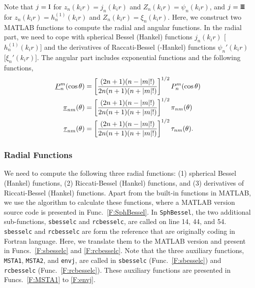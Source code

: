 \documentclass[journal=jacsat,manuscript=article,layout=traditional]{achemso}
\newcommand{\norF}[1]{\underline{\vb{#1}}}
\newcommand{\joinR}{\hspace{-.17em}}
\newcommand{\NRomanI}{\normalsize\textrm{I}}
\newcommand{\NRomanIII}{\mbox{\NRomanI\joinR\NRomanI\joinR\NRomanI}}
\newcommand{\subsubsectiontoc}[1]{\subsubsection{#1}\addcontentsline{toc}{subsubsection}{#1}}
\newcommand{\cfont}[1]{\texttt{#1}}
\begin{document}
Note that $j=\NRomanI$ for $z_n(k_ir)=j_n(k_ir)$ and $Z_n(k_ir)=\psi_n(k_ir)$, and $j=\NRomanIII$ for $z_n(k_ir)=h_n^{(1)}(k_ir)$ and $Z_n(k_ir)=\xi_n(k_ir)$.
Here, we construct two MATLAB functions to compute the radial and angular functions.
In the radial part, we need to cope with spherical Bessel (Hankel) functions $j_n(k_ir)$ [$h_n^{(1)}(k_ir)$] and the derivatives of Raccati-Bessel (-Hankel) functions $\psi_{n}'(k_ir)$ [$\xi_{n}'(k_ir)$].
The angular part includes exponential functions and the following functions, 
\begin{subequations}
    \begin{align}
        \underline{P}_n^m(\cos\theta)&=
        \left[\frac{(2n+1)(n-\abs{m}!)}{2n(n+1)(n+\abs{m}!)}\right]^{1/2}
        P_n^m(\cos\theta)\\
        \norF{\pi}_{nm}(\theta)&=
        \left[\frac{(2n+1)(n-\abs{m}!)}{2n(n+1)(n+\abs{m}!)}\right]^{1/2}
        \pi_{nm}(\theta)\\
        \norF{\tau}_{nm}(\theta)&=
        \left[\frac{(2n+1)(n-\abs{m}!)}{2n(n+1)(n+\abs{m}!)}\right]^{1/2}
        \tau_{nm}(\theta).
    \end{align}
    \label{Eq:normPolar}
\end{subequations}

\subsubsectiontoc{Radial Functions}
We need to compute the following three radial functions: (1) spherical Bessel (Hankel) functions, (2) Riccati-Bessel (Hankel) functions, and (3) derivatives of Riccati-Bessel (Hankel) functions.
Apart from the built-in functions in MATLAB, we use the algorithm\cite{crandall1997computation} to calculate these functions, where a MATLAB version source code is presented in Func.~\ref{F:SphBessel}.
In \cfont{SphBessel}, the two additional sub-functions, \cfont{sbesselc} and \cfont{rcbesselc}, are called on line 14, 44, and 54.
\cfont{sbesselc} and \cfont{rcbesselc} are form the reference\cite{crandall1997computation} that are originally coding in Fortran language.
Here, we translate them to the MATLAB version and present in Funcs.~\ref{F:sbesselc} and \ref{F:rcbesselc}.
Note that the three auxiliary functions, \cfont{MSTA1}, \cfont{MSTA2}, and \cfont{envj}, are called in \cfont{sbesselc} (Func.~\ref{F:sbesselc}) and  \cfont{rcbesselc} (Func.~\ref{F:rcbesselc}).
These auxiliary functions are presented in Funcs.~\ref{F:MSTA1} to \ref{F:envj}.

\newpage

\newpage

\newpage



\end{document}
